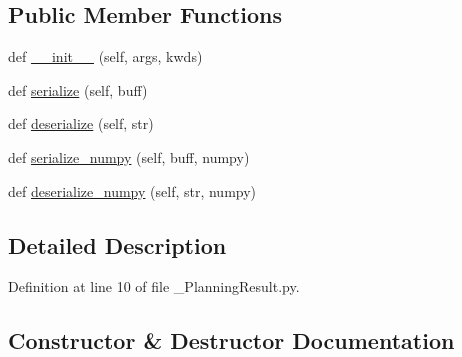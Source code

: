 \subsection*{Public Member Functions}
\begin{DoxyCompactItemize}
\item 
def \hyperlink{classmotion__plan_1_1msg_1_1__PlanningResult_1_1PlanningResult_aa2ff349aff776749f8f329fc2ffc688f}{\+\_\+\+\_\+init\+\_\+\+\_\+} (self, args, kwds)
\item 
def \hyperlink{classmotion__plan_1_1msg_1_1__PlanningResult_1_1PlanningResult_a7325dd722c01ea020fee9f389f3e32bc}{serialize} (self, buff)
\item 
def \hyperlink{classmotion__plan_1_1msg_1_1__PlanningResult_1_1PlanningResult_a489458d17451b5d892c77b08047b416f}{deserialize} (self, str)
\item 
def \hyperlink{classmotion__plan_1_1msg_1_1__PlanningResult_1_1PlanningResult_a21fb764c10300fc1ac79fe0e6390151a}{serialize\+\_\+numpy} (self, buff, numpy)
\item 
def \hyperlink{classmotion__plan_1_1msg_1_1__PlanningResult_1_1PlanningResult_a33fea39d6f70464b017008de819f794b}{deserialize\+\_\+numpy} (self, str, numpy)
\end{DoxyCompactItemize}


\subsection{Detailed Description}


Definition at line 10 of file \+\_\+\+Planning\+Result.\+py.



\subsection{Constructor \& Destructor Documentation}
\mbox{\label{classmotion__plan_1_1msg_1_1__PlanningResult_1_1PlanningResult_aa2ff349aff776749f8f329fc2ffc688f}} 
